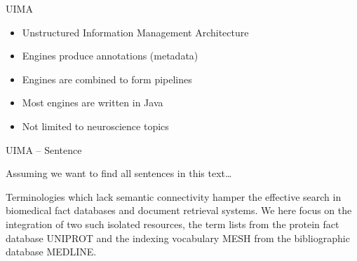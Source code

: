 \documentclass[10pt, compress, xcolor={usenames,dvipsnames}]{beamer}
\newcommand{\SmallArrow}{\ding{228}}
\renewcommand{\emph}[1]{\alert{#1}}
\begin{document}





\begin{frame}[fragile]{UIMA}

  \begin{itemize}[label=\SmallArrow, itemsep=1em]

    \item Unstructured Information Management Architecture

    \item \emph{Engines} produce \emph{annotations} (metadata)

    \item Engines are combined to form \emph{pipelines}

    \item Most engines are written in Java

    \item Not limited to neuroscience topics

  \end{itemize}

\end{frame}

\begin{frame}[fragile]{UIMA -- Sentence}

  Assuming we want to find all sentences in this text\ldots

  \vspace{1em}

  \begin{myquote}
    Terminologies which lack semantic connectivity hamper the effective search
    in biomedical fact databases and document retrieval systems. We here focus
    on the integration of two such isolated resources, the term lists from the
    protein fact database UNIPROT and the indexing vocabulary MESH from the
    bibliographic database MEDLINE.
  \end{myquote}

\end{frame}
\end{document}
